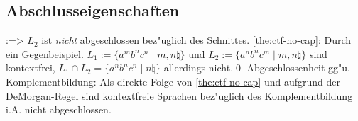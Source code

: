 \subsection{Abschlusseigenschaften}
\label{sub:ctf-complete}
\theorem:=>{
  \label{the:ctf-no-cap}
  $L_2$ ist \emph{nicht} abgeschlossen bez"uglich des Schnittes.
  }
\proof \ref{the:ctf-no-cap}:{
  Durch ein Gegenbeispiel. 
  $L_1:=\{a^m b^n c^n\mid m,n\natural\}$ und
  $L_2:=\{a^n b^n c^m\mid m,n\natural\}$
  sind kontextfrei, $L_1\cap L_2=\{a^n b^n c^n\mid n\natural\}$ allerdings
  nicht.\qed
  }
\remark Abgeschlossenheit gg"u. Komplementbildung:{
  Als direkte Folge von \ref{the:ctf-no-cap} und
  aufgrund der DeMorgan-Regel sind kontextfreie Sprachen bez"uglich
  des Komplementbildung i.A. nicht abgeschlossen.
  }
